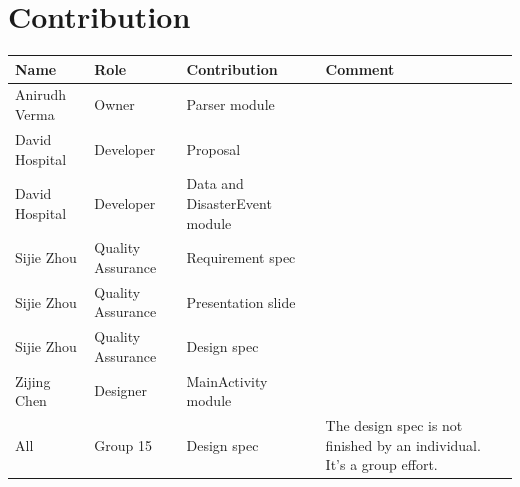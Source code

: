 \documentclass[12pt]{article}
\begin{document}
\section{Contribution}
\begin{tabular}{|p{3cm}|p{4cm}|p{3cm}|p{5cm}|}
\hline
Name	&Role	&Contribution	&Comment\\
\hline
Anirudh Verma	&Owner	&Parser module	&\\
\hline
David Hospital	&Developer	&Proposal	&\\
\hline
David Hospital	&Developer	&Data and DisasterEvent module	&\\
\hline
Sijie Zhou	&Quality Assurance	&Requirement spec	&\\
\hline
Sijie Zhou	&Quality Assurance	&Presentation slide	&\\
\hline
Sijie Zhou	&Quality Assurance	&Design spec	&\\
\hline
Zijing Chen	&Designer	&MainActivity module	&\\
\hline
All	&Group 15	&Design spec	&The design spec is not finished by an individual. It’s a group effort.\\
\hline
\end{tabular}
\end{document}
